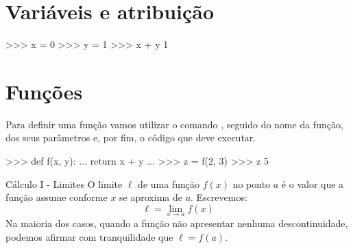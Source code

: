 	\section*{Variáveis e atribuição}%
	\begin{lstpython}
	>>> x = 0
	>>> y = 1
	>>> x + y
	1
	\end{lstpython}

	\section*{Funções}%
	Para definir uma função vamos utilizar o comando , seguido do nome da função, dos seus parâmetros e, por fim, o código que deve executar.
	\begin{lstpython}
	>>> def f(x, y):
	...		return x + y
	...
	>>> z = f(2, 3)
	>>> z
	5
	\end{lstpython}

    \begin{problem}[p:calculo:1]{Cálculo I - Limites}
	O limite $\ell$ de uma função $f(x)$ no ponto $a$ é o valor que a função assume conforme $x$ se aproxima de $a$. Escrevemos:
		$$\ell = \lim_{x \to a} f(x)$$
	Na maioria dos casos, quando a função não apresentar nenhuma descontinuidade, podemos afirmar com tranquilidade que $\ell = f(a)$. 
	\end{problem}

